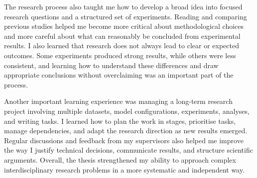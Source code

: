 The research process also taught me how to develop a broad idea into focused research questions and a structured set of experiments. Reading and comparing previous studies helped me become more critical about methodological choices and more careful about what can reasonably be concluded from experimental results. I also learned that research does not always lead to clear or expected outcomes. Some experiments produced strong results, while others were less consistent, and learning how to understand these differences and draw appropriate conclusions without overclaiming was an important part of the process.

Another important learning experience was managing a long-term research project involving multiple datasets, model configurations, experiments, analyses, and writing tasks. I learned how to plan the work in stages, prioritise tasks, manage dependencies, and adapt the research direction as new results emerged. Regular discussions and feedback from my supervisors also helped me improve the way I justify technical decisions, communicate results, and structure scientific arguments. Overall, the thesis strengthened my ability to approach complex interdisciplinary research problems in a more systematic and independent way.


